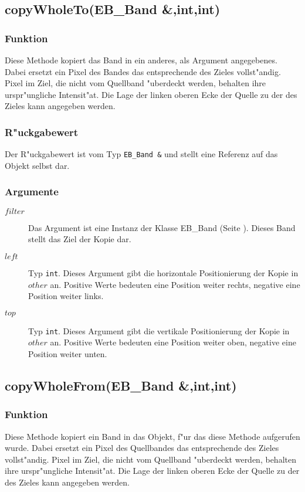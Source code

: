 \documentclass[12pt,a4paper,draft,twoside,onecolumn,titlepage]{book}
\newcommand{\pref}[1]{(Seite \pageref{#1})}
\newcommand{\carg}[1]{$ #1 $}
\newcommand{\ctyp}[1]{{\tt #1}}
\newcommand{\class}[1]{{\sc #1}}
\newcommand{\arglist}[1]{\footnotesize{#1}}
\begin{document}
\subsection{copyWholeTo\arglist{(EB\_Band \&,int,int)}}
\subsubsection{Funktion}
Diese Methode kopiert das Band in ein anderes, als Argument angegebenes. Dabei ersetzt ein Pixel des Bandes das entsprechende des Zieles vollst"andig. Pixel im Ziel, die nicht vom Quellband "uberdeckt werden, behalten ihre urspr"ungliche Intensit"at. Die Lage der linken oberen Ecke der Quelle zu der des Zieles kann angegeben werden.
\subsubsection{R"uckgabewert}
Der R"uckgabewert ist vom Typ \ctyp{EB\_Band \&} und stellt eine Referenz auf das Objekt selbst dar. 
\subsubsection{Argumente}
\begin{description}
\item[\carg{filter}]{Das Argument ist eine Instanz der Klasse \class{EB\_Band} \pref{classebband}. Dieses Band stellt das Ziel der Kopie dar.}
\item[\carg{left}]{Typ \ctyp{int}. Dieses Argument gibt die horizontale Positionierung der Kopie in \carg{other} an. Positive Werte bedeuten eine Position weiter rechts, negative eine Position weiter links.}
\item[\carg{top}]{Typ \ctyp{int}. Dieses Argument gibt die vertikale Positionierung der Kopie in \carg{other} an. Positive Werte bedeuten eine Position weiter oben, negative eine Position weiter unten.}
\end{description}
\subsection{copyWholeFrom\arglist{(EB\_Band \&,int,int)}}
\subsubsection{Funktion}
Diese Methode kopiert ein Band in das Objekt, f"ur das diese Methode aufgerufen wurde. Dabei ersetzt ein Pixel des Quellbandes das entsprechende des Zieles vollst"andig. Pixel im Ziel, die nicht vom Quellband "uberdeckt werden, behalten ihre urspr"ungliche Intensit"at. Die Lage der linken oberen Ecke der Quelle zu der des Zieles kann angegeben werden.
\end{document}
